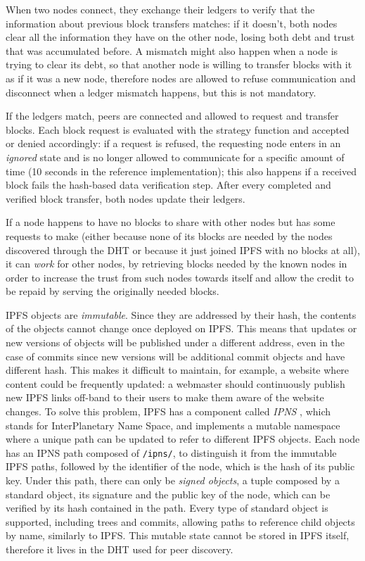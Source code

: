 \documentclass[mscthesis]{usiinfthesis}
\begin{document}
When two nodes connect, they exchange their ledgers to verify that the information about previous block transfers matches: if it doesn't, both nodes clear all the information they have on the other node, losing both debt and trust that was accumulated before. A mismatch might also happen when a node is trying to clear its debt, so that another node is willing to transfer blocks with it as if it was a new node, therefore nodes are allowed to refuse communication and disconnect when a ledger mismatch happens, but this is not mandatory.

If the ledgers match, peers are connected and allowed to request and transfer blocks. Each block request is evaluated with the strategy function and accepted or denied accordingly: if a request is refused, the requesting node enters in an \textit{ignored} state and is no longer allowed to communicate for a specific amount of time (10 seconds in the reference implementation); this also happens if a received block fails the hash-based data verification step. After every completed and verified block transfer, both nodes update their ledgers.

If a node happens to have no blocks to share with other nodes but has some requests to make (either because none of its blocks are needed by the nodes discovered through the DHT or because it just joined IPFS with no blocks at all), it can \textit{work} for other nodes, by retrieving blocks needed by the known nodes in order to increase the trust from such nodes towards itself and allow the credit to be repaid by serving the originally needed blocks.

IPFS objects are \emph{immutable}. Since they are addressed by their hash, the contents of the objects cannot change once deployed on IPFS. This means that updates or new versions of objects will be published under a different address, even in the case of commits since new versions will be additional commit objects and have different hash. This makes it difficult to maintain, for example, a website where content could be frequently updated: a webmaster should continuously publish new IPFS links off-band to their users to make them aware of the website changes. To solve this problem, IPFS has a component called \emph{IPNS} %
, which stands for InterPlanetary Name Space, and implements a mutable namespace where a unique path can be updated to refer to different IPFS objects. Each node has an IPNS path composed of \texttt{/ipns/}, to distinguish it from the immutable IPFS paths, followed by the identifier of the node, which is the hash of its public key. Under this path, there can only be \textit{signed objects}, a tuple composed by a standard object, its signature and the public key of the node, which can be verified by its hash contained in the path. Every type of standard object is supported, including trees and commits, allowing paths to reference child objects by name, similarly to IPFS. This mutable state cannot be stored in IPFS itself, therefore it lives in the DHT used for peer discovery.
\end{document}
